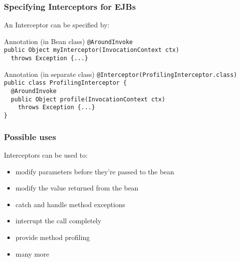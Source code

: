 \documentclass{beamer}
\begin{document}
\begin{frame}
  \frametitle{Specifying Interceptors for EJBs}

  An Interceptor can be specified by:

  \begin{block}{Annotation (in Bean class)}
  \tt\alert{@AroundInvoke} \\
  public Object myInterceptor(InvocationContext ctx) \\
  \ \ throws Exception \{...\}
  \end{block}

  \begin{block}{Annotation (in separate class)}
  \tt\alert{@Interceptor(ProfilingInterceptor.class)} \\
  public class ProfilingInterceptor \{ \\
  \ \ \alert{@AroundInvoke} \\
  \ \ public Object profile(InvocationContext ctx) \\
  \ \ \ \ throws Exception \{...\} \\
  \}
  \end{block}

\end{frame}


\begin{frame}
  \frametitle{Possible uses}

  Interceptors can be used to:
  \begin{itemize}
  \item modify parameters before they're passed to the bean
  \item modify the value returned from the bean
  \item catch and handle method exceptions
  \item interrupt the call completely
  \item provide method profiling
  \item many more
  \end{itemize}
\end{frame}
\end{document}
